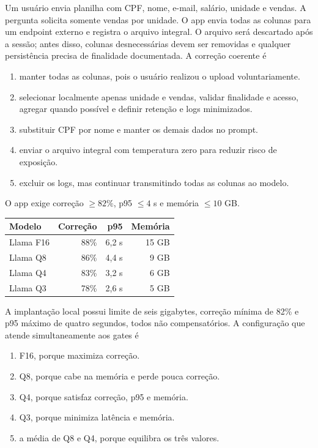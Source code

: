 \TextoBase
Um usuário envia planilha com CPF, nome, e-mail, salário, unidade e vendas. A pergunta solicita somente vendas por unidade. O app envia todas as colunas para um endpoint externo e registra o arquivo integral.
O arquivo será descartado após a sessão; antes disso, colunas desnecessárias devem ser removidas e qualquer persistência precisa de finalidade documentada.
\FonteDidatica
\Comando A correção coerente é
\begin{enumerate}[label=\Alph*)]
\item manter todas as colunas, pois o usuário realizou o upload voluntariamente.
\item selecionar localmente apenas unidade e vendas, validar finalidade e acesso, agregar quando possível e definir retenção e logs minimizados.
\item substituir CPF por nome e manter os demais dados no prompt.
\item enviar o arquivo integral com temperatura zero para reduzir risco de exposição.
\item excluir os logs, mas continuar transmitindo todas as colunas ao modelo.
\end{enumerate}

\TextoBase
O app exige correção $\geq82\%$, p95 $\leq4$ s e memória $\leq10$ GB.
\begin{center}\small
\begin{tabularx}{\textwidth}{@{}Yrrr@{}}\toprule
\textbf{Modelo} & \textbf{Correção} & \textbf{p95} & \textbf{Memória}\\\midrule
Llama F16 & 88\% & 6,2 s & 15 GB\\
Llama Q8 & 86\% & 4,4 s & 9 GB\\
Llama Q4 & 83\% & 3,2 s & 6 GB\\
Llama Q3 & 78\% & 2,6 s & 5 GB\\\bottomrule
\end{tabularx}\end{center}
\FonteDidatica
A implantação local possui limite de seis gigabytes, correção mínima de 82\% e p95 máximo de quatro segundos, todos não compensatórios.
\Comando A configuração que atende simultaneamente aos gates é
\begin{enumerate}[label=\Alph*)]
\item F16, porque maximiza correção.
\item Q8, porque cabe na memória e perde pouca correção.
\item Q4, porque satisfaz correção, p95 e memória.
\item Q3, porque minimiza latência e memória.
\item a média de Q8 e Q4, porque equilibra os três valores.
\end{enumerate}


